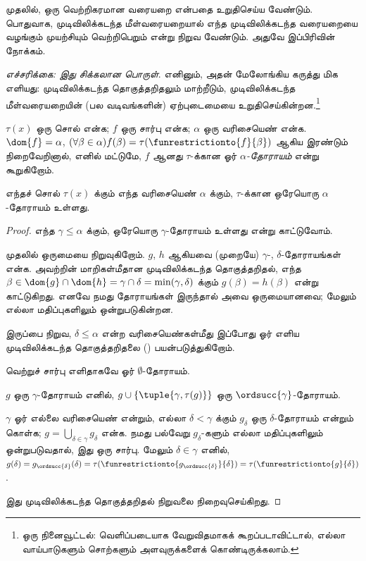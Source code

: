 \documentclass[../../../include/open-logic-section]{subfiles}
\begin{document}

முதலில்,  ஒரு வெற்றிகரமான வரையறை என்பதை
உறுதிசெய்ய வேண்டும். பொதுவாக, முடிவிலிக்கடந்த மீள்வரையறையால் எந்த
முடிவிலிக்கடந்த வரையறையை வழங்கும் முயற்சியும் வெற்றிபெறும் என்று
நிறுவ வேண்டும். அதுவே இப்பிரிவின் நோக்கம்.

\emph{எச்சரிக்கை: இது சிக்கலான பொருள்}. எனினும், அதன் மேலோங்கிய கருத்து
மிக எளியது: முடிவிலிக்கடந்த தொகுத்தறிதலும் மாற்றீடும், முடிவிலிக்கடந்த
மீள்வரையறையின் (பல வடிவங்களின்) ஏற்புடைமையை உறுதிசெய்கின்றன.\footnote{ஒரு
நினைவூட்டல்: வெளிப்படையாக வேறுவிதமாகக் கூறப்படாவிட்டால், எல்லா வாய்பாடுகளும்
சொற்களும் அளவுருக்களைக் கொண்டிருக்கலாம்.}

\begin{defn}
	$\tau(x)$ ஒரு சொல் என்க; $f$ ஒரு சார்பு என்க; $\alpha$ ஒரு வரிசையெண்
	என்க. $\dom{f} = \alpha$, $(\forall \beta \in \alpha)f(\beta) =
	\tau(\funrestrictionto{f}{\beta})$ ஆகிய இரண்டும் நிறைவேறினால், எனில்
	மட்டுமே, $f$ ஆனது $\tau$-க்கான ஓர் \emph{$\alpha$-தோராயம்} என்று
	கூறுகிறோம்.
\end{defn}

\begin{lem}[வரம்பிட்ட மீள்வரையறை]
எந்தச் சொல் $\tau(x)$ க்கும் எந்த வரிசையெண் $\alpha$ க்கும்,
$\tau$-க்கான ஒரேயொரு $\alpha$-தோராயம் உள்ளது.
\end{lem}
\begin{proof}
எந்த $\gamma \leq \alpha$ க்கும், ஒரேயொரு $\gamma$-தோராயம் உள்ளது
என்று காட்டுவோம்.

முதலில் ஒருமையை நிறுவுகிறோம். $g$, $h$ ஆகியவை (முறையே) $\gamma$-,
$\delta$-தோராயங்கள் என்க. அவற்றின் மாறிகள்மீதான முடிவிலிக்கடந்த
தொகுத்தறிதல், எந்த $\beta \in \dom{g} \cap \dom{h} = \gamma \cap
\delta = \min(\gamma, \delta)$ க்கும் $g(\beta) = h(\beta)$ என்று
காட்டுகிறது. எனவே நமது தோராயங்கள் இருந்தால் அவை ஒருமையானவை; மேலும் எல்லா
மதிப்புகளிலும் ஒன்றுபடுகின்றன.

இருப்பை நிறுவ, $\delta \leq \alpha$ என்ற வரிசையெண்கள்மீது இப்போது ஓர்
எளிய முடிவிலிக்கடந்த தொகுத்தறிதலை
() பயன்படுத்துகிறோம்.

வெற்றுச் சார்பு எளிதாகவே ஓர் $\emptyset$-தோராயம்.

$g$ ஒரு $\gamma$-தோராயம் எனில், $g \cup
\{\tuple{\gamma, \tau(g)}\}$ ஒரு $\ordsucc{\gamma}$-தோராயம்.

$\gamma$ ஓர் எல்லை வரிசையெண் என்றும், எல்லா $\delta < \gamma$ க்கும்
$g_\delta$ ஒரு $\delta$-தோராயம் என்றும் கொள்க; $g = \bigcup_{\delta
\in \gamma} g_\delta$ என்க. நமது பல்வேறு $g_\delta$-களும் எல்லா
மதிப்புகளிலும் ஒன்றுபடுவதால், இது ஒரு சார்பு. மேலும் $\delta \in
\gamma$ எனில், $g(\delta) = g_{\ordsucc{\delta}}(\delta) =
\tau(\funrestrictionto{g_{\ordsucc{\delta}}}{\delta}) =
\tau(\funrestrictionto{g}{\delta})$.

இது முடிவிலிக்கடந்த தொகுத்தறிதல் நிறுவலை நிறைவுசெய்கிறது.
\end{proof}
\end{document}
